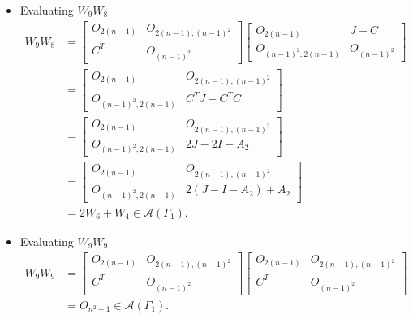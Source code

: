 \begin{itemize}
    \item Evaluating $W_9W_8$
    \begin{align*}
        W_9W_8
        &=\begin{bmatrix}
            O_{2(n-1)} & O_{2(n-1), (n-1)^2} \\
            C^T & O_{(n-1)^2}
        \end{bmatrix}\begin{bmatrix}
            O_{2(n-1)} & J-C \\
            O_{(n-1)^2, 2(n-1)} & O_{(n-1)^2}
        \end{bmatrix} \\
        &= \begin{bmatrix}
            O_{2(n-1)} & O_{2(n-1), (n-1)^2} \\
            O_{(n-1)^2, 2(n-1)} & C^TJ - C^TC
        \end{bmatrix}\\
        &= \begin{bmatrix}
            O_{2(n-1)} & O_{2(n-1), (n-1)^2} \\
            O_{(n-1)^2, 2(n-1)} & 2J - 2I-A_2
        \end{bmatrix}\\
        &= \begin{bmatrix}
            O_{2(n-1)} & O_{2(n-1), (n-1)^2} \\
            O_{(n-1)^2, 2(n-1)} & 2(J - I-A_2) + A_2
        \end{bmatrix}\\
        &= 2W_6 + W_4\in\mathcal{A}(\Gamma_1).
    \end{align*}
    
    \item Evaluating $W_9W_9$
    \begin{align*}
        W_9W_9
        &=\begin{bmatrix}
            O_{2(n-1)} & O_{2(n-1), (n-1)^2} \\
            C^T & O_{(n-1)^2}
        \end{bmatrix}\begin{bmatrix}
            O_{2(n-1)} & O_{2(n-1), (n-1)^2} \\
            C^T & O_{(n-1)^2}
        \end{bmatrix} \\
        &= O_{n^2-1}\in\mathcal{A}(\Gamma_1).
    \end{align*}
    

\end{itemize}
